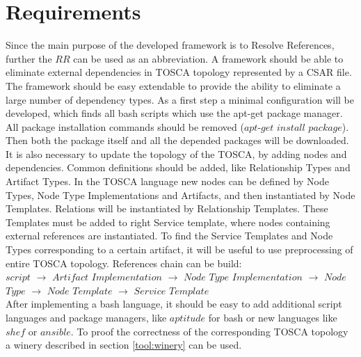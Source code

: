 
\chapter{Requirements}
\label{chap:req}
Since the main purpose of the developed framework is to Resolve References, further the $RR$ can be used as an abbreviation. 
A framework should be able to eliminate external dependencies in TOSCA topology represented by a CSAR file.
The framework should be easy extendable to provide the ability to eliminate a large number of dependency types.
As a first step a minimal configuration will be developed, which finds all bash scripts which use the apt-get package manager. 
All package installation commands should be removed ($apt$-$get$ $install$ $package$).
Then both the package itself and all the depended packages will be downloaded.
It is also necessary to update the topology of the TOSCA, by adding nodes and dependencies.
Common definitions should be added, like Relationship Types and Artifact Types.
In the TOSCA language new nodes can be defined by Node Types, Node Type Implementations and Artifacts, and then instantiated by Node Templates. 
Relations will be instantiated by  Relationship Templates.
These Templates must be added to right Service template, where nodes containing external references are instantiated.
To find the Service Templates and Node Types corresponding to a certain artifact, it will be useful to use preprocessing of entire TOSCA topology. 
References chain can be build:\\
$script$ $\rightarrow$ $Artifact$ $Implementation$ $\rightarrow$ $Node$ $Type$ $Implementation$ $\rightarrow$ $Node$ $Type$ $\rightarrow$ $Node$ $Template$ $\rightarrow$ $Service$ $Template$\\
After implementing a bash language, it should be easy to add additional script languages and package managers, like $aptitude$ for bash or new languages like $shef$ or $ansible$.
To proof the correctness of the corresponding TOSCA topology a winery described in section \ref{tool:winery} can be used.
